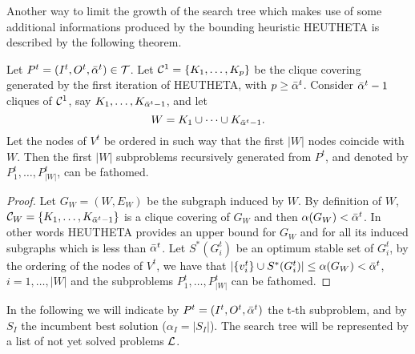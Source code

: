 Another way to limit the growth of the search tree which makes use
of some additional informations produced by the bounding heuristic
HEUTHETA is described by the following theorem. 
\begin{theorem}
Let $P^t = (I^t,O^t,{\bar \alpha}^t) \in {\cal T}$.  Let ${\cal C}^1 =
\{K_1,\dots,K_p\} $ be the clique covering generated by the first
iteration of HEUTHETA, with $p \geq {\bar \alpha}^t$. Consider 
${\bar \alpha}^t-1$ cliques of ${\cal C}^1$, say
$K_1,\dots,K_{{\bar \alpha}^t-1}$,  and let 
 \begin{equation}
 \label {eq-Wset}
 W = K_1 \cup \dots \cup K_{{\bar \alpha}^t-1}. 
\end {equation}
Let the nodes of $V^t$ be ordered in such way that the first $|W|$
nodes coincide with $W$. Then the first $|W|$ subproblems recursively
generated from $P^t$, and denoted by  $P^t_1,\dots,P^t_{|W|}$, can be
fathomed. 
\end{theorem}
\begin{proof}
  Let $G_W = (W,E_W)$ be the subgraph induced by
$W$. By definition of $W$,  ${\cal
C}_W=\{K_1,\dots,K_{{\bar \alpha}^t-1}\}$ is a clique covering of $G_W$  and
then $\alpha(G_W) < {\bar \alpha}^t$. In other words HEUTHETA provides an
upper bound for  $G_W$ and for all its induced subgraphs which is
less than ${\bar \alpha}^t$. Let $S^*(G_i^t)$ be an optimum stable set of
$G_i^t$, by the ordering of the nodes of $V^t$, we have that 
$|\{v_i^t\} \cup S^*(G_i^t)| \leq \alpha(G_W) < {\bar \alpha}^t$,
$i=1,\dots,|W|$ and the subproblems $P^t_1,\dots,P^t_{|W|}$
 can be fathomed. 
\end{proof}

 In the following we will indicate by $P^t=(I^t,O^t,{\bar \alpha}^t)$ the
t-th  subproblem, and by $S_I$ the incumbent best solution
($\alpha_I = |S_I|$). The search tree will be represented by a list
of not yet solved problems ${\cal L}$.
